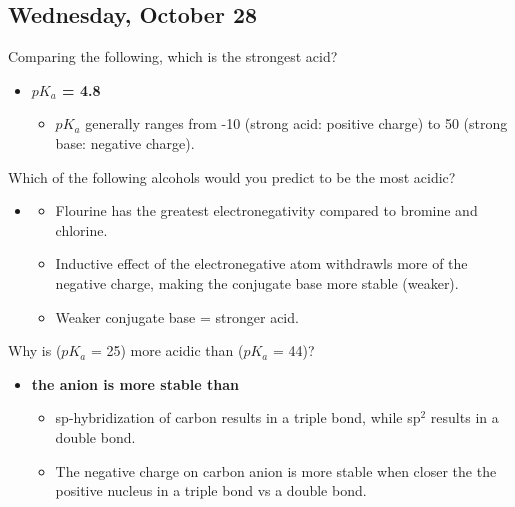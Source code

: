 \documentclass[12pt,a4paper]{article}
\begin{document}
\subsection{Wednesday, October 28}
\begin{enumerate}
    {\color{G-Moon}\item Comparing the following, which is the strongest acid?}
        \begin{itemize}
            \item {\color{o-Sun}\textbf{ \(pK_a\) = 4.8}}
                \begin{itemize}
                    \item \(pK_a\) generally ranges from {\color{pos}-10 (strong acid: positive charge)} to {\color{neg}50 (strong base: negative charge)}.
                \end{itemize}
        \end{itemize}
    {\color{G-Moon}\item Which of the following alcohols would you predict to be the most acidic?}
        \begin{itemize}
            \item {\color{o-Sun}\textbf{}}
                \begin{itemize}
                    \item Flourine has the greatest electronegativity compared to bromine and chlorine.
                    \item Inductive effect of the electronegative atom withdrawls more of the negative charge, making the conjugate base more stable (weaker).
                    \item Weaker conjugate base = stronger acid.
                \end{itemize}
        \end{itemize}
    {\color{G-Moon}\item Why is  (\(pK_a\) = 25) more acidic than  (\(pK_a\) = 44)?}
        \begin{itemize}
            \item {\color{o-Sun}\textbf{the  anion is more stable than }}
                \begin{itemize}
                    \item sp-hybridization of carbon results in a triple bond, while sp\(^{2}\) results in a double bond.
                    \item The negative charge on carbon anion is more stable when closer the the positive nucleus in a triple bond vs a double bond.

\end{itemize}
\end{itemize}
\end{enumerate}
\end{document}
